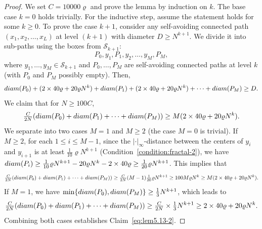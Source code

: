 \documentclass[10pt,a4paper]{amsart}
\begin{document}
\begin{proof}
    We set $C = 10000 \varrho$ and prove the lemma by induction on $k$. The base case $k = 0$ holds trivially. For the inductive step, assume the statement holds for some $k \ge 0$. To prove the case $k+1$, consider any self-avoiding connected path $(x_1, x_2, \ldots, x_L)$ at level $(k+1)$ with diameter $D \geq N^{k+1}$. We divide it into sub-paths using the boxes from $\mathcal{S}_{k+1}$:
    $$ P_0, y_1, P_1, y_2, \ldots, y_M, P_M, $$
    where $y_1,\ldots,y_M \in \mathcal S_{k+1}$ and $P_0,\ldots,P_M$ are self-avoiding connected paths at level $k$ (with $P_0$ and $P_M$ possibly empty). Then,
    \begin{equation}\label{eq:lem5.13-1}
        {\rm diam}(P_0) + (2 \times 40\varrho + 20\varrho N^k) + {\rm diam}(P_1) + (2 \times 40\varrho + 20\varrho N^k) + \cdots +{\rm diam}(P_M) \geq D.
    \end{equation}
    We claim that for $N \geq 100 C$, 
    \begin{equation}\label{eq:lem5.13-2}
        \tfrac{C}{2N} ({\rm diam}(P_0) + {\rm diam}(P_1) + \cdots +  {\rm diam}(P_M)) \geq M (2 \times 40\varrho + 20\varrho N^k).
    \end{equation}
    We separate into two cases $M = 1$ and $M \geq 2$ (the case $M = 0$ is trivial). If $M \geq 2$, for each $1 \leq i \leq M-1$, since the $|\cdot|_\infty$-distance between the centers of $y_i$ and $y_{i+1}$ is at least $\frac{1}{10} \varrho N^{k+1}$ (Condition~\ref{condition:fractal-2}), we have ${\rm diam}(P_i) \geq \frac{1}{10} \varrho N^{k+1} - 20\varrho N^k - 2 \times 40 \varrho\geq \frac{1}{20} \varrho N^{k+1}$. This implies that
    $$
    \tfrac{C}{2N} ({\rm diam}(P_0) + {\rm diam}(P_1) + \cdots +  {\rm diam}(P_M)) \geq \tfrac{C}{2N} (M-1) \tfrac{1}{20} \varrho N^{k+1} \geq 100 M\varrho N^k \geq M(2 \times 40\varrho + 20\varrho N^k).
    $$
    If $M = 1$, we have $\min \{ {\rm diam}(P_0), {\rm diam}(P_M) \} \geq \frac{1}{3} N^{k+1}$, which leads to
    $$
    \tfrac{C}{2N} ({\rm diam}(P_0) + {\rm diam}(P_1) + \cdots +  {\rm diam}(P_M)) \geq \tfrac{C}{2N} \times \tfrac{1}{3} N^{k+1} \geq 2 \times 40\varrho + 20\varrho N^k.
    $$
    Combining both cases establishes Claim~\eqref{eq:lem5.13-2}.
    

\end{proof}
\end{document}
